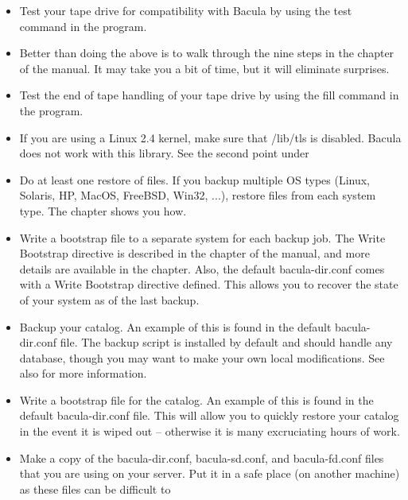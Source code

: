 \begin{itemize}
\item Test your tape drive for compatibility with Bacula by using the  test
   command in the  program. 
\item Better than doing the above is to walk through the nine steps in the  
    chapter of the manual. It 
   may take you a bit of time, but it will eliminate surprises. 
\item Test the end of tape handling of your tape drive by using the
   fill command in the  program.
\item If you are using a Linux 2.4 kernel, make sure that /lib/tls is disabled. Bacula
   does not work with this library. See the second point under 
\item Do at least one restore of files. If you backup multiple OS types
   (Linux, Solaris, HP, MacOS, FreeBSD, Win32, ...),
   restore files from each system type. The 
    chapter shows you how. 
\item Write a bootstrap file to a separate system for each backup job.  The
   Write Bootstrap directive is described in the  
     chapter of the
   manual, and more details are available in the  
    chapter. Also, the default
   bacula-dir.conf comes with a Write Bootstrap directive defined. This  allows
   you to recover the state of your system as of the last backup.  
\item Backup your catalog. An example of this is found in the default
   bacula-dir.conf file. The backup script is installed by default and
   should handle any database, though you may want to make your own local
   modifications.  See also  for more
   information.
\item Write a bootstrap file for the catalog. An example of this is found in
   the default bacula-dir.conf file. This will allow you to quickly restore your
   catalog in the event it is wiped out -- otherwise it  is many excruciating
   hours of work.  
\item Make a copy of the bacula-dir.conf, bacula-sd.conf, and
   bacula-fd.conf files that you are using on your server. Put it in a safe
   place (on another machine) as these files can be difficult to

\end{itemize}
